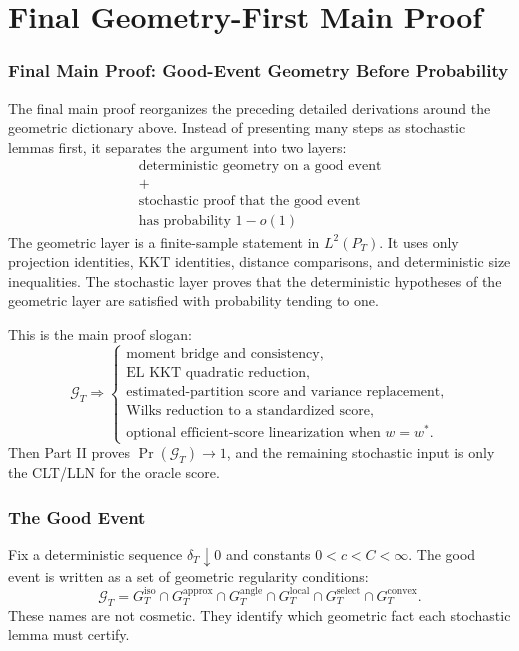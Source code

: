 \documentclass[12pt]{article}
\numberwithin{equation}{section}
\theoremstyle{definition}
\begin{document}
\part{Final Geometry-First Main Proof}

\section{Final Main Proof: Good-Event Geometry Before Probability}

The final main proof reorganizes the preceding detailed derivations around the geometric dictionary above. Instead
of presenting many steps as stochastic lemmas first, it separates the argument
into two layers:
\[
\begin{array}{c}
    \text{deterministic geometry on a good event}\\[3pt]
    +\\[3pt]
    \text{stochastic proof that the good event}\\
    \text{has probability }1-o(1)
\end{array}
\]
The geometric layer is a finite-sample statement in \(L^2(P_T)\). It uses only
projection identities, KKT identities, distance comparisons, and deterministic
size inequalities. The stochastic layer proves that the deterministic hypotheses
of the geometric layer are satisfied with probability tending to one.

This is the main proof slogan:
\[
    \mathcal G_T
    \Longrightarrow
    \left\{
    \begin{array}{l}
    \text{moment bridge and consistency},\\
    \text{EL KKT quadratic reduction},\\
    \text{estimated-partition score and variance replacement},\\
    \text{Wilks reduction to a standardized score},\\
    \text{optional efficient-score linearization when }w=w^*.
    \end{array}
    \right.
\]
Then Part II proves \(\Pr(\mathcal G_T)\to1\), and the remaining stochastic
input is only the CLT/LLN for the oracle score.

\section{The Good Event}

Fix a deterministic sequence \(\delta_T\downarrow0\) and constants
\(0<c<C<\infty\). The good event is written as a set of geometric regularity
conditions:
\[
    \mathcal G_T
    =G_T^{\mathrm{iso}}
     \cap G_T^{\mathrm{approx}}
     \cap G_T^{\mathrm{angle}}
     \cap G_T^{\mathrm{local}}
     \cap G_T^{\mathrm{select}}
     \cap G_T^{\mathrm{convex}}.
\]
These names are not cosmetic. They identify which geometric fact each
stochastic lemma must certify.
\end{document}
